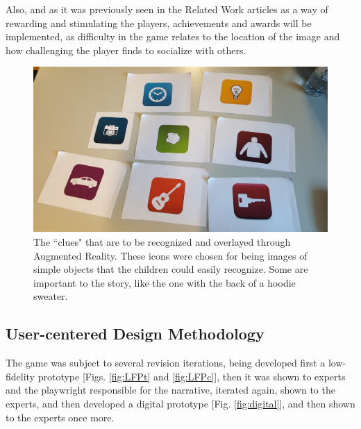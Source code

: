 \documentclass[runningheads]{llncs}
\begin{document}
\par Also, and as it was previously seen in the Related Work articles \cite{ref_article10,ref_article11,ref_article13} as a way of rewarding and stimulating the players, achievements and awards will be implemented, as difficulty in the game relates to the location of the image and how challenging the player finds to socialize with others. 

\begin{figure}
    \centering
    \includegraphics[scale = 0.3]{Icons.jpg}
    \caption{The ``clues" that are to be recognized and overlayed through Augmented Reality. These icons were chosen for being images of simple objects that the children could easily recognize. Some are important to the story, like the one with the back of a hoodie sweater.}
    \label{fig:icons}
\end{figure}

\subsection{User-centered Design Methodology}
\par The game was subject to several revision iterations, being developed first a low-fidelity prototype [Figs. \ref{fig:LFPt} and \ref{fig:LFPc}], then it was shown to experts and the playwright responsible for the narrative, iterated again, shown to the experts, and then developed a digital prototype [Fig. \ref{fig:digital}], and then shown to the experts once more.
\end{document}
